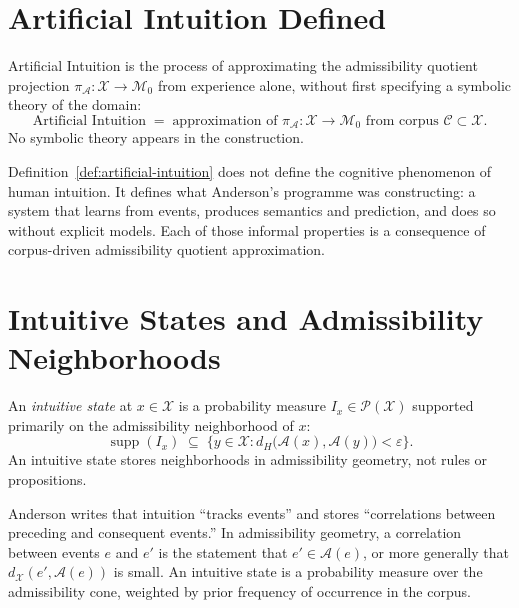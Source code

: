 \documentclass[12pt, a4paper, oneside]{book}
\newcommand{\Adm}{\mathcal{A}}
\newcommand{\X}{\mathcal{X}}
\newcommand{\M}{\mathcal{M}}
\newcommand{\C}{\mathcal{C}}
\newcommand{\projA}{\pi_{\!\Adm}}
\newcommand{\dH}{d_H}
\begin{document}
\section{Artificial Intuition Defined}

\begin{definition}
\label{def:artificial-intuition}
Artificial Intuition is the process of approximating the admissibility
quotient projection $\projA : \X \to \M_0$ from experience alone, without
first specifying a symbolic theory of the domain:
\[
  \text{Artificial Intuition}
  \;=\;
  \text{approximation of } \projA : \X \to \M_0
  \text{ from corpus } \C \subset \X.
\]
No symbolic theory appears in the construction.
\end{definition}

\begin{remark}
Definition~\ref{def:artificial-intuition} does not define the cognitive
phenomenon of human intuition. It defines what Anderson's programme was
constructing: a system that learns from events, produces semantics and
prediction, and does so without explicit models. Each of those informal
properties is a consequence of corpus-driven admissibility quotient
approximation.
\end{remark}

\section{Intuitive States and Admissibility Neighborhoods}

\begin{definition}
\label{def:intuitive-state}
An \emph{intuitive state} at $x \in \X$ is a probability measure
$I_x \in \mathcal{P}(\X)$ supported primarily on the admissibility
neighborhood of $x$:
\[
  \operatorname{supp}(I_x)
  \;\subseteq\;
  \bigl\{
    y \in \X : \dH\bigl(\Adm(x), \Adm(y)\bigr) < \varepsilon
  \bigr\}.
\]
An intuitive state stores neighborhoods in admissibility geometry,
not rules or propositions.
\end{definition}

\begin{remark}
Anderson writes that intuition ``tracks events'' and stores
``correlations between preceding and consequent events.'' In admissibility
geometry, a correlation between events $e$ and $e'$ is the statement
that $e' \in \Adm(e)$, or more generally that $d_\X(e', \Adm(e))$ is
small. An intuitive state is a probability measure over the admissibility
cone, weighted by prior frequency of occurrence in the corpus.
\end{remark}
\end{document}
